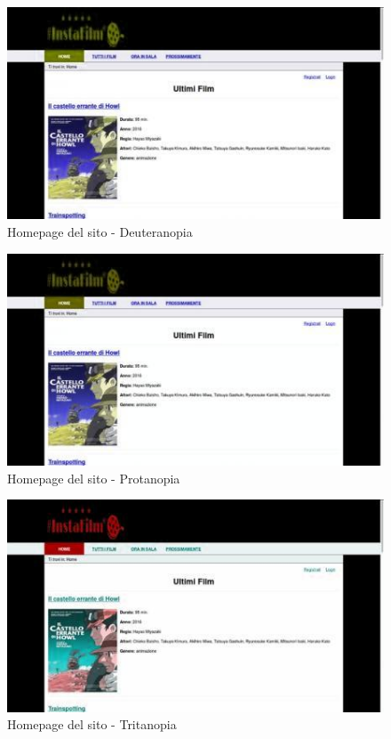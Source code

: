 \documentclass[../Relazione.tex]{subfiles}
\begin{document}
\begin{figure}[!h]
		\centering
		\includegraphics[scale=0.7]{immagini/prova_deuteranopia.jpg}
			\caption{Homepage del sito - Deuteranopia}
		\label{fig:Homepage del sito}
\end{figure}

\begin{figure}[!h]
		\centering
		\includegraphics[scale=0.7]{immagini/prova_protanopia.jpg}
			\caption{Homepage del sito - Protanopia}
		\label{fig:Homepage del sito}
\end{figure}

\begin{figure}[!h]
		\centering
		\includegraphics[scale=0.7]{immagini/prova_tritanopia.jpg}
			\caption{Homepage del sito - Tritanopia}
		\label{fig:Homepage del sito}
\end{figure}
\end{document}
